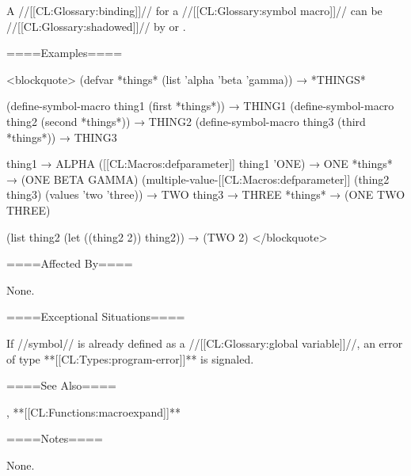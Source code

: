 A //[[CL:Glossary:binding]]// for a //[[CL:Glossary:symbol macro]]// can be //[[CL:Glossary:shadowed]]// by  or .

====Examples====

<blockquote> (defvar *things* (list 'alpha 'beta 'gamma)) → *THINGS*

(define-symbol-macro thing1 (first *things*)) → THING1 (define-symbol-macro thing2 (second *things*)) → THING2 (define-symbol-macro thing3 (third *things*)) → THING3

thing1 → ALPHA ([[CL:Macros:defparameter]] thing1 'ONE) → ONE *things* → (ONE BETA GAMMA) (multiple-value-[[CL:Macros:defparameter]] (thing2 thing3) (values 'two 'three)) → TWO thing3 → THREE *things* → (ONE TWO THREE)

(list thing2 (let ((thing2 2)) thing2)) → (TWO 2) </blockquote>

====Affected By====

None.

====Exceptional Situations====

If //symbol// is already defined as a //[[CL:Glossary:global variable]]//, an error of type **[[CL:Types:program-error]]** is signaled.

====See Also====

, **[[CL:Functions:macroexpand]]**

====Notes====

None.

